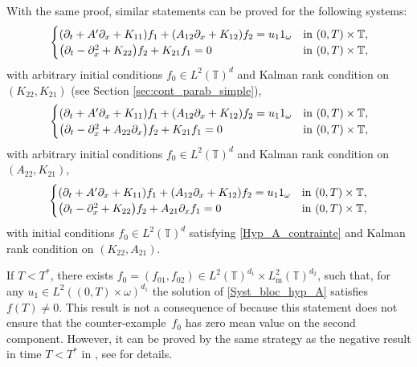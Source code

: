 \documentclass[10pt]{amsart}
\theoremstyle{plain}
\theoremstyle{definition}
\theoremstyle{remark}
\newcommand{\set}{\mathbb}
\newcommand{\T}{\set{T}}
\newcommand{\m}{{\mathrm m}}
\let\originalleft\left
\let\originalright\right
\renewcommand{\left}{\mathopen{}\mathclose\bgroup\originalleft}
\renewcommand{\right}{\aftergroup\egroup\originalright}
\begin{document}
With the same proof, similar statements can be proved for the following systems:
\begin{equation} \label{Syst_bloc_hyp_K_0}
\begin{cases}
\left(\partial_t +A'\partial_x+K_{11}\right)f_1+\left(A_{12}\partial_x+K_{12}\right)f_2= u_1 1_\omega
&\text{in}\ (0,T)\times \T,\!\\
\left(\partial_t -\partial_x^2+K_{22}\right)f_2 + K_{21} f_1 = 0 &\text{in}\ (0,T)\times \T,\!\\
\end{cases}
\end{equation}
with arbitrary initial conditions $f_0\!\in\!L^2(\T)^d$ and Kalman rank condition on $(K_{22},K_{21})$ (see Section \ref{sec:cont_parab_simple}),
\begin{equation}
\begin{cases}
\left(\partial_t +A'\partial_x+K_{11}\right)f_1+\left(A_{12}\partial_x+K_{12}\right)f_2= u_1 1_\omega
&\text{in}\ (0,T)\times \T,\!\\
\left(\partial_t -\partial_x^2+A_{22} \partial_x \right)f_2 + K_{21} f_1 = 0 &\text{in}\ (0,T)\times \T,\!\\
\end{cases}
\end{equation}
with arbitrary initial conditions $f_0\!\in\!L^2(\T)^d$ and Kalman rank condition on $(A_{22},K_{21})$,%
\begin{equation}\label{Syst_bloc_K_0bis}
\begin{cases}
\left(\partial_t +A'\partial_x+K_{11}\right)f_1+\left(A_{12}\partial_x+K_{12}\right)f_2= u_1 1_\omega
&\text{in}\ (0,T)\times \T,\!\\
\left(\partial_t -\partial_x^2+K_{22} \right)f_2 + A_{21} \partial_x f_1 = 0 &\text{in}\ (0,T)\times \T,
\end{cases}
\end{equation}
with initial conditions $f_0 \in L^2(\T)^d$ satisfying \eqref{Hyp_A_contrainte} and Kalman rank condition on $(K_{22},A_{21})$.

If $T<T^*$, there exists $f_0=(f_{01},f_{02})\in L^2(\T)^{d_1} \times L^2_\m(\T)^{d_2}$, such that, for any \hbox{$u_1 \in L^2((0,T)\times\omega)^{d_1}$} the solution of \eqref{Syst_bloc_hyp_A} satisfies $f(T) \neq 0$. This result is not a consequence of  because this statement does not ensure that the counter-example~$f_0$ has zero mean value on the second component. However, it can be proved by the same strategy as the negative result in time $T<T^*$ in , see  for details.
\end{document}
